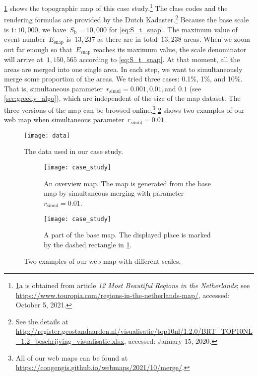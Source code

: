 \documentclass[twocolumn]{svjour3}          %
\begin{document}
%
\fig\ref{fig:data} shows the topographic map of this case study.\footnote{%
    \fig\ref{fig:data}a is obtained from article 
    \emph{12 Most Beautiful Regions in the Netherlands}; see
    \url{https://www.touropia.com/regions-in-the-netherlands-map/},
    accessed: October 5, 2021.}
The class codes and the rendering formulas are provided by the Dutch Kadaster.\footnote{%
See the details at
\url{http://register.geostandaarden.nl/visualisatie/top10nl/1.2.0/BRT_TOP10NL_1.2_beschrijving_visualisatie.xlsx},
accessed: January 15, 2020.}
%
Because the base scale is $1:10{,}000$, 
we have~$S_\mathrm{b} = 10{,}000$ for \eq\ref{eq:S_t_snap}.
The maximum value of event number~$E_\mathrm{snap}$ is~$13{,}237$
as there are in total~$13{,}238$ areas.
When we zoom out far enough 
so that~$E_\mathrm{snap}$ reaches its maximum value,
the scale denominator will arrive at~$1{,}150{,}565$
according to \eq\ref{eq:S_t_snap}.
At that moment, all the areas are merged into one single area.
In each step, we want to simultaneously merge some proportion of the areas.
We tried three cases: 0.1\%, 1\%, and 10\%.
That is, simultaneous parameter~$r_\mathrm{simul}=0.001, 0.01, \text{and~} 0.1$ 
(see \sect\ref{sec:greedy_algo}), 
which are independent of the size of the map dataset.
The three versions of the map can be browsed online.\footnote{%
All of our web maps can be found at
\url{https://congengis.github.io/webmaps/2021/10/merge/}.}
\fig\ref{fig:web_map} shows two examples of our web map when 
simultaneous parameter~$r_\mathrm{simul}=0.01$.


\begin{figure}[tb]
\centering
\texttt{[image: data]}
\caption{
    The data used in our case study.}
\label{fig:data}
\end{figure}


\begin{figure}[tb]
\centering
\begin{subfigure}[t]{0.49\textwidth}
\centering
\texttt{[image: case\_study]}
\caption{An overview map. The map is generated from the base map 
    by simultaneous merging with parameter~$r_\mathrm{simul}= 0.01$.}
\end{subfigure}
\newline
\vspace{0.5cm}
%
\begin{subfigure}[t]{0.49\textwidth}
\centering
\texttt{[image: case\_study]}
\caption{A part of the base map. The displayed place is marked 
    by the dashed rectangle in \fig\ref{fig:data}.}
\end{subfigure}
\caption{Two examples of our web map with different scales.
    }
\label{fig:web_map}
\end{figure}
\end{document}
